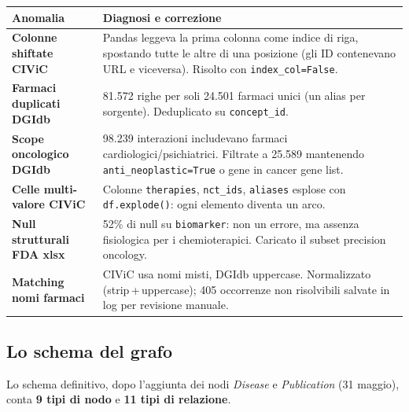 \documentclass[11pt,a4paper]{article}
\newcommand{\code}[1]{\texttt{\small #1}}
\begin{document}
\begin{center}
\small
\begin{tabularx}{\textwidth}{@{}>{\bfseries\color{primary}}l X@{}}
\toprule
Anomalia & Diagnosi e correzione \\
\midrule
Colonne shiftate CIViC & Pandas leggeva la prima colonna come indice di riga, spostando tutte le altre di una posizione (gli ID contenevano URL e viceversa). Risolto con \code{index\_col=False}. \\
Farmaci duplicati DGIdb & 81.572 righe per soli 24.501 farmaci unici (un alias per sorgente). Deduplicato su \code{concept\_id}. \\
Scope oncologico DGIdb & 98.239 interazioni includevano farmaci cardiologici/psichiatrici. Filtrate a 25.589 mantenendo \code{anti\_neoplastic=True} o gene in cancer gene list. \\
Celle multi-valore CIViC & Colonne \code{therapies}, \code{nct\_ids}, \code{aliases} esplose con \code{df.explode()}: ogni elemento diventa un arco. \\
Null strutturali FDA xlsx & 52\% di null su \code{biomarker}: non un errore, ma assenza fisiologica per i chemioterapici. Caricato il subset precision oncology. \\
Matching nomi farmaci & CIViC usa nomi misti, DGIdb uppercase. Normalizzato (strip\,+\,uppercase); 405 occorrenze non risolvibili salvate in log per revisione manuale. \\
\bottomrule
\end{tabularx}
\end{center}

\subsection{Lo schema del grafo}
Lo schema definitivo, dopo l'aggiunta dei nodi \emph{Disease} e \emph{Publication} (31 maggio), conta \textbf{9 tipi di nodo} e \textbf{11 tipi di relazione}.
\end{document}
